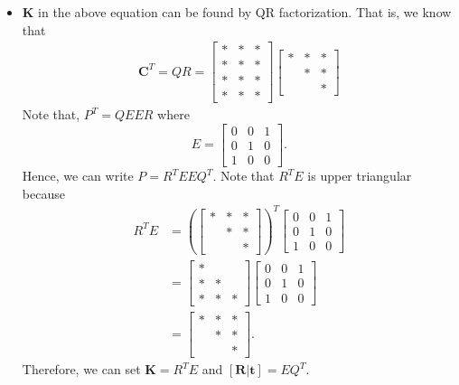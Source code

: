 \documentclass[10pt]{article}
\newcommand{\ve}[1]{\mathbf{#1}}
\begin{document}
\begin{itemize}
    \item $\ve{K}$ in the above equation can be found by QR factorization. That is,
      we know that
      \begin{align*}
        \ve{C}^T = QR = 
        \begin{bmatrix} 
          * & * & * \\
          * & * & * \\
          * & * & * \\
          * & * & *          
        \end{bmatrix}
        \begin{bmatrix} * & * & * \\ & * & * \\ &   & * \end{bmatrix}
      \end{align*}
      Note that, $P^T = Q E E R$ where $$E = \begin{bmatrix} 0 & 0 & 1 \\ 0 & 1 & 0 \\ 1 & 0 & 0 \end{bmatrix}.$$
      Hence, we can write $P = R^T E E Q^T$. Note that $R^T E$ is upper triangular because
      \begin{align*}
        R^T E 
        &= 
        \left( \begin{bmatrix} * & * & * \\ & * & * \\ &   & * \end{bmatrix} \right)^T
        \begin{bmatrix} 0 & 0 & 1 \\ 0 & 1 & 0 \\ 1 & 0 & 0 \end{bmatrix}\\
        &=
        \begin{bmatrix} * &  &  \\ * & * & \\ * & * & * \end{bmatrix}
        \begin{bmatrix} 0 & 0 & 1 \\ 0 & 1 & 0 \\ 1 & 0 & 0 \end{bmatrix}\\
        &= \begin{bmatrix} * & * & * \\ & * & * \\ &   & * \end{bmatrix}.
      \end{align*}
      Therefore, we can set $\ve{K} = R^T E$ and $[\ve{R}|\ve{t}] = E Q^T$.          
  \end{itemize}
  
\end{document}
